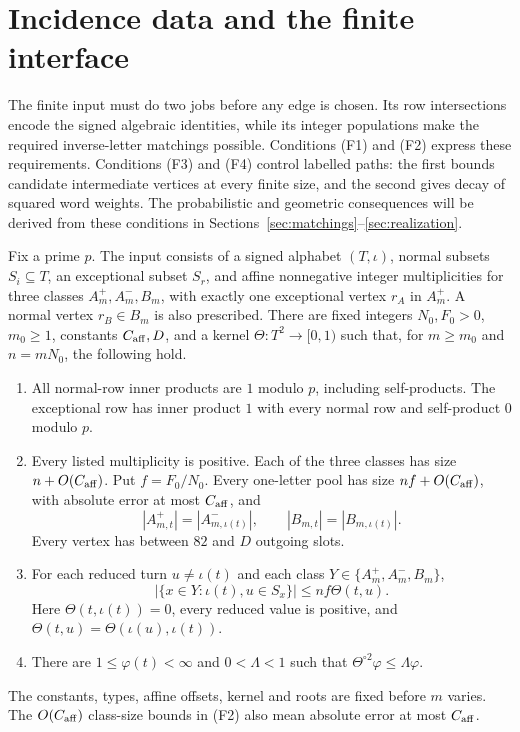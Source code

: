 \section{Incidence data and the finite interface}\label{sec:incidence}
The finite input must do two jobs before any edge is chosen. Its row intersections encode the signed algebraic identities, while its integer populations make the required inverse-letter matchings possible. Conditions (F1) and (F2) express these requirements. Conditions (F3) and (F4) control labelled paths: the first bounds candidate intermediate vertices at every finite size, and the second gives decay of squared word weights. The probabilistic and geometric consequences will be derived from these conditions in Sections~\ref{sec:matchings}--\ref{sec:realization}.

\begin{definition}\label{def:admissible}
Fix a prime $p$. The input consists of a signed alphabet $(T,\iota)$, normal subsets $S_i\subseteq T$, an exceptional subset $S_r$, and affine nonnegative integer multiplicities for three classes $A_m^+,A_m^-,B_m$, with exactly one exceptional vertex $r_A$ in $A_m^+$. A normal vertex $r_B\in B_m$ is also prescribed. There are fixed integers $N_0,F_0>0$, $m_0\ge1$, constants $C_{\rm aff},D$, and a kernel $\Theta:T^2\to[0,1)$ such that, for $m\ge m_0$ and $n=mN_0$, the following hold.
\begin{enumerate}[label=\textup{(F\arabic*)},leftmargin=2.7em]
\item All normal-row inner products are $1$ modulo $p$, including self-products. The exceptional row has inner product $1$ with every normal row and self-product $0$ modulo $p$.
\item Every listed multiplicity is positive. Each of the three classes has size $n+O(C_{\rm aff})$. Put $f=F_0/N_0$. Every one-letter pool has size $nf+O(C_{\rm aff})$, with absolute error at most $C_{\rm aff}$, and
\[
 |A^+_{m,t}|=|A^-_{m,\iota(t)}|,\qquad |B_{m,t}|=|B_{m,\iota(t)}|.
\]
Every vertex has between $82$ and $D$ outgoing slots.
\item For each reduced turn $u\ne\iota(t)$ and each class $Y\in\{A_m^+,A_m^-,B_m\}$,
\[
 |\{x\in Y:\iota(t),u\in S_x\}|\le nf\Theta(t,u).
\]
Here $\Theta(t,\iota(t))=0$, every reduced value is positive, and $\Theta(t,u)=\Theta(\iota(u),\iota(t))$.
\item There are $1\le\varphi(t)<\infty$ and $0<\Lambda<1$ such that $\Theta^{\circ2}\varphi\le\Lambda\varphi$.
\end{enumerate}
The constants, types, affine offsets, kernel and roots are fixed before $m$ varies. The $O(C_{\rm aff})$ class-size bounds in (F2) also mean absolute error at most $C_{\rm aff}$.
\end{definition}

